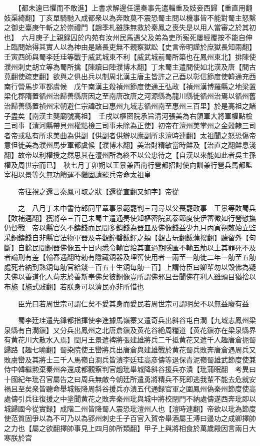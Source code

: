 　　【都未遠已懼而不敢進】上書求解邊任還奏事先遣輜重及妓妾西歸【重直用翻妓渠綺翻】丁亥單騎馳入成都衆以為奔敗莫不震恐蜀主問以機事皆不能對蜀主怒繫之御史臺庚午斬之於崇禮門【趙季札雖誅無救於秦鳳之喪失是以用人當審之於其初也】　六月庚子上親録囚於内苑有汝州民馬遇父及弟為吏所寃死屢經覆按不能自伸上臨問始得其實人以為神由是諸長吏無不親察獄訟【史言帝明謹於庶獄長知兩翻】　壬寅西師與蜀李廷珪等戰于威武城東不利【威武城前蜀所築也在鳳州東北】排陳使濮州刺史胡立等為蜀所擒【陳讀曰陣濮博木翻】丁未蜀主遣間使如北漢及唐【間古莧翻使疏吏翻】欲與之俱出兵以制周北漢主唐主皆許之己酉以彰信節度使韓通充西南行營馬步軍都虞候　戊午南漢主殺禎州節度使通王弘政【禎州漢博羅縣之地梁置梁化郡隋置循州治歸善縣唐因之至南唐改唐之河源縣為龍川縣徙循州治焉以循州舊治歸善縣置禎州宋朝避仁宗諱改曰惠州九域志循州南至惠州三百里】於是高祖之諸子盡矣【南漢主龑廟號高祖】　壬戌以樞密院承旨清河張美為右領軍大將軍權點檢三司事【清河縣帶貝州權點檢三司事未除為正使】初帝在澶州美掌州之金穀隸三司者帝或私有所求美曲為供副【供副者供辦以應副所求澶時連翻】太祖聞之怒恐傷帝意但徙美為濮州馬步軍都虞候【濮博木翻】美治財精敏當時鮮及【治直之翻鮮息淺翻】故帝以利權授之然思其在澶州所為終不以公忠待之【自漢以來能如此者吳主孫權及周世宗而已】　秋七月丁卯朔以王景兼西南行營都招討使向訓兼行營兵馬都監宰相以景等久無功饋運不繼固請罷兵帝命太祖皇

　　帝往視之還言秦鳳可取之狀【還從宣翻又如字】帝從

　　之　八月丁未中書侍郎同平章事景範罷判三司尋以父喪罷政事　王景等敗蜀兵【敗補邁翻】獲將卒三百己未蜀主遣通奏使知樞密院武泰節度使伊審徵如行營慰撫仍督戰　帝以縣官久不鑄錢而民間多銷錢為器皿及佛像錢益少九月丙寅朔敇始立監采銅鑄錢自非縣官法物軍器及寺觀鐘磬鈸鐸之類【觀古玩翻鈸蒲撥翻】聽留外【句斷】自餘民間銅器佛像五十日内悉令輸官給其直過期隱匿不輸五觔以上其罪死不及者論刑有差【輸舂遇翻時勅有隱藏銅器及埋窖使用者一兩至一觔徙二年一觔至五觔處死若納到熟銅每觔官給錢一百五十生銅每觔一百】上謂侍臣曰卿輩勿以毁佛為疑夫佛以善道化人苟志於善斯奉佛矣彼銅像豈所謂佛邪且吾聞佛在利人雖頭目猶捨以布施【施式䜴翻】若朕身可以濟民亦非所惜也

　　臣光曰若周世宗可謂仁矣不愛其身而愛民若周世宗可謂明矣不以無益廢有益

　　蜀李廷珪遣先鋒都指揮使李進據馬嶺寨又遣奇兵出斜谷屯白澗【九域志鳳州梁泉縣有白澗鎭】又分兵出鳳州之北唐倉鎭及黄花谷絶周糧道【黄花鎭亦在梁泉縣界有黄花川大散水入焉】閏月王景遣裨將張建雄將兵二千抵黄花又遣千人趣唐倉扼蜀歸路【趣七喻翻】蜀染院使王巒將兵出唐倉與建雄戰於黄花蜀兵敗奔唐倉遇周兵又敗虜巒及其將士三千人馬嶺白澗兵皆潰李廷珪高彦儔等退保青泥嶺蜀雄武節度使兼侍中韓繼勲棄秦州奔還成都觀察判官趙玭舉城降斜谷援兵亦潰【玭蒲眠翻　考異曰十國紀年玭召官屬告之曰周兵無敵今朝廷所遣勇將精兵不死即逃我輩不能去危就安禍且至矣衆皆聽命舉城叛降周斜谷援兵亦潰五代通録官軍之圍鳳州偽秦州節度使高處儔引兵往復援之中塗聞黄花之敗奔秦州玭與城中將校閉門不納處儔遂西奔玭即以城歸國今從實録】成階二州皆降蜀人震恐玭澶州人也【澶時連翻】帝欲以玭為節度使范質固爭以為不可乃以為郢州刺史壬子百官入賀帝舉酒屬王溥曰邊功之成卿擇帥之力也【屬之欲翻擇帥事見上四月帥所類翻】甲子上與將相食於萬歲殿因言兩日大寒朕於宫


